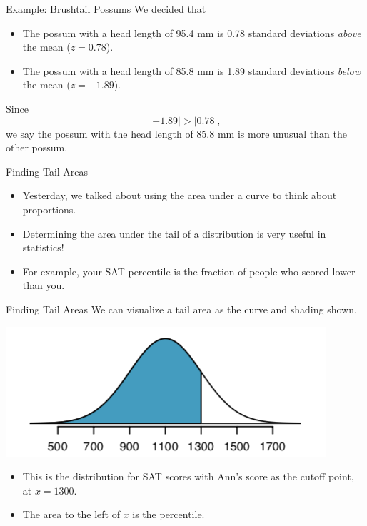 \begin{frame}{Example: Brushtail Possums}
    We decided that
    \begin{itemize}
        \item The possum with a head length of 95.4 mm is 0.78 standard deviations \textit{above} the mean ($z=0.78$).
        \item The possum with a head length of 85.8 mm is 1.89 standard deviations \textit{below} the mean ($z=-1.89$).
    \end{itemize}
    Since 
    \[
        |-1.89| > |0.78|,
    \]
    we say the possum with the head length of 85.8 mm is more unusual than the other possum.
\end{frame}

\begin{frame}{Finding Tail Areas}
    \begin{itemize}
        \item Yesterday, we talked about using the area under a curve to think about proportions.
        \item Determining the area under the tail of a distribution is very useful in statistics!
        \item For example, your SAT percentile is the fraction of people who scored lower than you.
    \end{itemize}
\end{frame}

\begin{frame}{Finding Tail Areas}
    We can visualize a tail area as the curve and shading shown. 
    \begin{center}
        \includegraphics[scale=0.5]{images/tailarea.png}
    \end{center}
    \begin{itemize}
        \item This is the distribution for SAT scores with Ann's score as the cutoff point, at $x=1300$.
        \item The area to the left of $x$ is the percentile.
    \end{itemize}
\end{frame}

